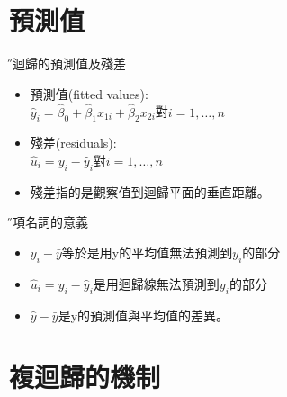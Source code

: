\documentclass[xcolor=dvipsnames]{beamer}
\begin{document}
\section{預測值}
\begin{frame}{\H 複迴歸的預測值及殘差}
\begin{itemize}
\item 預測值(fitted values): \\
$\hat{y}_{i}=\hat{\beta}_{0}+\hat{\beta}_{1}x_{\mathrm{1} i}+\hat{\beta}_{2}x_{\mathrm{2} i}$對$i=1,\dotsc, n$
\item 殘差(residuals): \\
$\hat{u}_{i}=y_{i}-\hat{y}_{i}$對$i=1,\dotsc, n$
\item 殘差指的是觀察值到迴歸平面的垂直距離。
\end{itemize}
\end{frame}
\begin{frame}{\H 各項名詞的意義}
\begin{itemize}
\item $y_{i}-\bar{y}$等於是用y的平均值無法預測到$y_{i}$的部分
\item $\hat{u}_{i}=y_{i}-\hat{y}_{i}$是用迴歸線無法預測到$y_{i}$的部分
\item $\hat{y}-\bar{y}$是y的預測值與平均值的差異。
\end{itemize}
\end{frame}
\section{複迴歸的機制}
\end{document}
